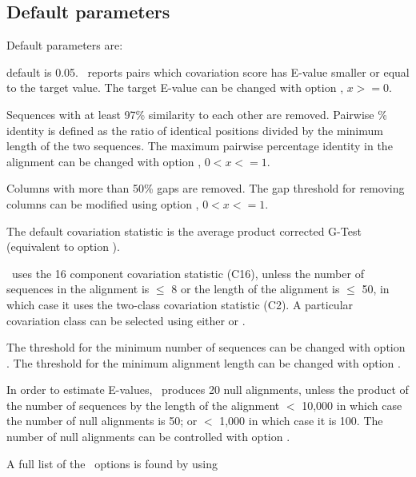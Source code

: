 \subsection{Default parameters}

Default parameters are:

\begin{sreitems}{}
\item[\emprog{Target E-value:}]default is 0.05. \rscape\, reports
  pairs which covariation score has E-value smaller or equal to the
  target value.  The target E-value can be changed with option
  , $x >= 0$.

\item[\emprog{Pairwise percent identity:}]Sequences with at least
  97\% similarity to each other are removed.  Pairwise \% identity is
  defined as the ratio of identical positions divided by the minimum
  length of the two sequences. The maximum pairwise percentage
  identity in the alignment can be changed with option , $0<x<=1$.

\item[\emprog{Gaps in columns:}]Columns with more than 50\% gaps are
  removed. The gap threshold for removing columns can be modified
   using option  , $0<x<=1$.

 \item[\emprog{Covariation statistic:}]The default covariation statistic
   is the average product corrected G-Test (equivalent to option
   ).

 \item[\emprog{Covariation Class:}]\rscape\ uses the 16 component
   covariation statistic (C16), unless the number of sequences in the
   alignment is $\leq$ 8 or the length of the alignment is $\leq$ 50,
   in which case it uses the two-class covariation statistic (C2). A
   particular covariation class can be selected using either
    or .

   The threshold for the minimum number of sequences can be changed
   with option .  The threshold for the minimum
   alignment length can be changed with option .

 \item[\emprog{Null alignments:}]In order to estimate E-values,
   \rscape\ produces 20 null alignments, unless the product of the
   number of sequences by the length of the alignment $<$ 10,000 in
   which case the number of null alignments is 50; or $<$ 1,000 in
   which case it is 100. The number of null alignments can be
   controlled with option .
 \end{sreitems}

 A full list of the \rscape\ options is found by using


 
 
